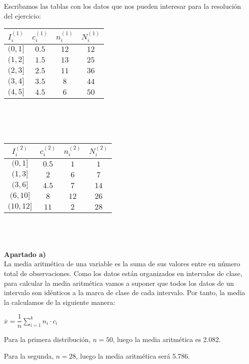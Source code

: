 Escribamos las tablas con los datos que nos pueden interesar para la resolución del ejercicio: \\

\begin{tabular}{| c | c | c | c |}
	\hline
	$I_i^{(1)}$ & $c_i^{(1)}$ & $n_i^{(1)}$ & $N_i^{(1)}$ \\ \hline
	$(0, 1]$ & $0.5$ & $12$ & $12$ \\
	$(1, 2]$ & $1.5$ & $13$ & $25$ \\
	$(2, 3]$ & $2.5$ & $11$ & $36$ \\
	$(3, 4]$ & $3.5$ & $8$ & $44$ \\
	$(4, 5]$ & $4.5$ & $6$ & $50$ \\ \hline
	
\end{tabular} \\\\\\
	
\begin{tabular}{| c | c | c | c |}
	\hline
	$I_i^{(2)}$ & $c_i^{(2)}$ & $n_i^{(2)}$ & $N_i^{(2)}$ \\ \hline
	$(0, 1]$ & $0.5$ & $1$ & $1$ \\
	$(1, 3]$ & $2$ & $6$ & $7$ \\
	$(3, 6]$ & $4.5$ & $7$ & $14$ \\
	$(6, 10]$ & $8$ & $12$ & $26$ \\
	$(10, 12]$ & $11$ & $2$ & $28$ \\ \hline

\end{tabular}\\
\\ 
\\
\textbf{Apartado a)}\\

La media aritmética de una variable es la suma de sus valores entre en número total de observaciones. Como los datos están organizados en intervalos de clase, para calcular la media aritmética vamos a suponer que todos los datos de un intervalo son idénticos a la marca de clase de cada intervalo. Por tanto, la media la calculamos de la siguiente manera: 
\begin{center}
	$\overline{x} = \dfrac{1}{n}\sum_{i=1}^{k}n_i·c_i$
\end{center}

Para la primera distribución, $n = 50$, luego la media aritmética es 2.082. 

Para la segunda, $n = 28$, luego la media aritmética será 5.786. \\


